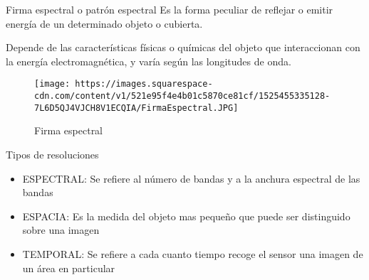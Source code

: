 \documentclass[
  ignorenonframetext,
]{beamer}
\begin{document}
\begin{frame}{Firma espectral o patrón espectral}
\protect\hypertarget{firma-espectral-o-patruxf3n-espectral}{}
Es la forma peculiar de reflejar o emitir energía de un determinado
objeto o cubierta.

Depende de las características físicas o químicas del objeto que
interaccionan con la energía electromagnética, y varía según las
longitudes de onda.

\begin{figure}
\centering
\texttt{[image: https://images.squarespace-cdn.com/content/v1/521e95f4e4b01c5870ce81cf/1525455335128-7L6D5QJ4VJCH8V1ECQIA/FirmaEspectral.JPG]}
\caption{Firma espectral}
\end{figure}
\end{frame}

\begin{frame}{Tipos de resoluciones}
\protect\hypertarget{tipos-de-resoluciones}{}
\begin{itemize}
\item
  ESPECTRAL: Se refiere al número de bandas y a la anchura espectral de
  las bandas
\item
  ESPACIA: Es la medida del objeto mas pequeño que puede ser distinguido
  sobre una imagen
\item
  TEMPORAL: Se refiere a cada cuanto tiempo recoge el sensor una imagen
  de un área en particular
\end{itemize}
\end{frame}
\end{document}
